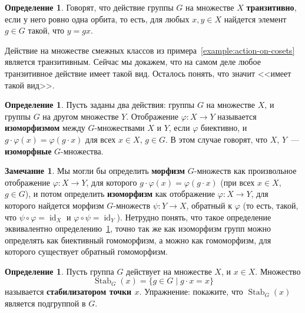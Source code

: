 \documentclass[a4paper,11pt]{scrartcl}
\theoremstyle{plain}
\theoremstyle{definition}
\newtheorem{definition}[theorem]{Определение}
\newtheorem{remark}[theorem]{Замечание}
\newcommand\dfn[1]{\textbf{#1}}
\newcommand\ph{\varphi}
\newcommand\id{\operatorname{id}}
\newcommand\Stab{\operatorname{Stab}}
\begin{document}
\begin{definition}
Говорят, что действие группы $G$ на множестве $X$ \dfn{транзитивно},
если у него ровно одна орбита, то есть, для любых $x,y\in X$
найдется элемент $g\in G$ такой, что $y = gx$.
\end{definition}

Действие на множестве смежных классов
из примера~\ref{example:action-on-cosets} является транзитивным.
Сейчас мы докажем, что на самом деле любое транзитивное действие
имеет такой вид.
Осталось понять, что значит <<имеет такой вид>>.

\begin{definition}\label{dfn:isomorphism-of-g-sets}
Пусть заданы два действия: группы $G$ на множестве $X$, и группы $G$
на другом множестве $Y$.
Отображение $\ph\colon X\to Y$ называется \dfn{изоморфизмом}
между $G$-множествами $X$ и $Y$, если $\ph$ биективно, и
$g\cdot \ph(x) = \ph(g\cdot x)$ для всех $x\in X$, $g\in G$.
В этом случае говорят, что $X$, $Y$~--- \dfn{изоморфные}
$G$-множества.
\end{definition}

\begin{remark}
Мы могли бы определить \dfn{морфизм} $G$-множеств как произвольное
отображение $\ph\colon X\to Y$, для которого
$g\cdot \ph(x) = \ph(g\cdot x)$ (при всех $x\in X$, $g\in G$),
и потом определить \dfn{изоморфизм} как отображение $\ph\colon X\to Y$,
для которого найдется морфизм $G$-множеств $\psi\colon Y\to X$,
обратный к $\ph$ (то есть, такой, что $\psi\circ\ph = \id_X$
и $\ph\circ\psi = \id_Y$).
Нетрудно понять, что такое определение эквивалентно
определению~\ref{dfn:isomorphism-of-g-sets}, точно так же как
изоморфизм групп можно определять как биективный гомоморфизм,
а можно как гомоморфизм, для которого существует обратный гомоморфизм.
\end{remark}

\begin{definition}
Пусть группа $G$ действует на множестве $X$, и $x\in X$.
Множество
$$
\Stab_G(x) = \{g\in G\mid g\cdot x = x\}
$$
называется \dfn{стабилизатором точки $x$}.
Упражнение: покажите, что $\Stab_G(x)$ является подгруппой в $G$.
\end{definition}
\end{document}
